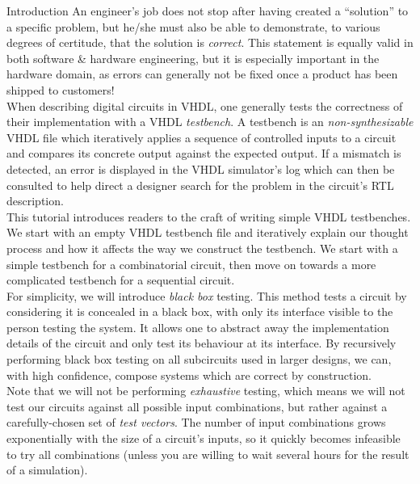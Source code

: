 \documentclass[a4paper, 12pt, onecolumn]{article}
\title{\documentTitle}
\date{\today}
\author{Sahand Kashani-Akhavan}
\begin{document}
\maketitle
\tableofcontents

\clearpage

\begin{section}{Introduction}
    An engineer's job does not stop after having created a ``solution'' to a specific problem, but he/she must also be able to demonstrate, to various degrees of certitude, that the solution is \emph{correct}. This statement is equally valid in both software \& hardware engineering, but it is especially important in the hardware domain, as errors can generally not be fixed once a product has been shipped to customers! \\

    When describing digital circuits in VHDL, one generally tests the correctness of their implementation with a VHDL \emph{testbench}. A testbench is an \emph{non-synthesizable} VHDL file which iteratively applies a sequence of controlled inputs to a circuit and compares its concrete output against the expected output. If a mismatch is detected, an error is displayed in the VHDL simulator's log which can then be consulted to help direct a designer search for the problem in the circuit's RTL description. \\

    This tutorial introduces readers to the craft of writing simple VHDL testbenches. We start with an empty VHDL testbench file and iteratively explain our thought process and how it affects the way we construct the testbench. We start with a simple testbench for a combinatorial circuit, then move on towards a more complicated testbench for a sequential circuit. \\

    For simplicity, we will introduce \emph{black box} testing. This method tests a circuit by considering it is concealed in a black box, with only its interface visible to the person testing the system. It allows one to abstract away the implementation details of the circuit and only test its behaviour at its interface. By recursively performing black box testing on all subcircuits used in larger designs, we can, with high confidence, compose systems which are correct by construction. \\

    Note that we will not be performing \emph{exhaustive} testing, which means we will not test our circuits against all possible input combinations, but rather against a carefully-chosen set of \emph{test vectors}. The number of input combinations grows exponentially with the size of a circuit's inputs, so it quickly becomes infeasible to try all combinations (unless you are willing to wait several hours for the result of a simulation).
\end{section}
\end{document}
